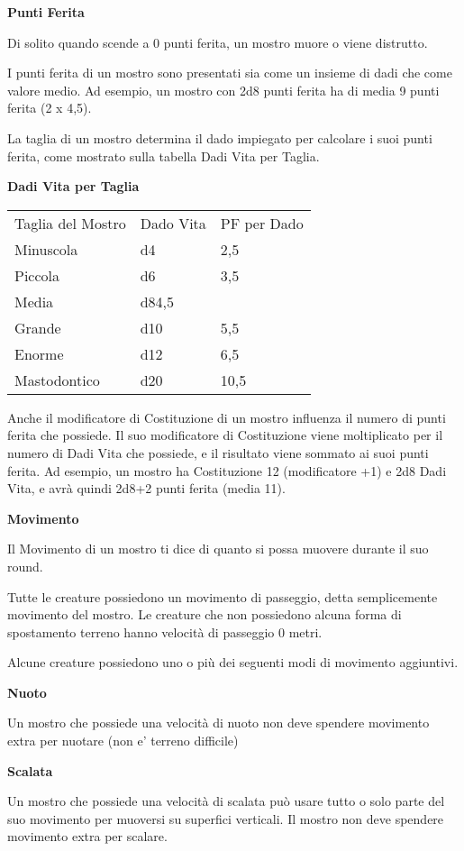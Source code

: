 \begin{multicols}{2}
\textbf{Punti Ferita}

Di solito quando scende a 0 punti ferita, un mostro muore o viene
distrutto.

I punti ferita di un mostro sono presentati sia come un insieme di dadi
che come valore medio. Ad esempio, un mostro con 2d8 punti ferita ha di
media 9 punti ferita (2 x 4,5).

La taglia di un mostro determina il dado impiegato per calcolare i suoi
punti ferita, come mostrato sulla tabella Dadi Vita per Taglia.

\textbf{Dadi Vita per Taglia}


\begin{tabular}{lll}
\toprule
Taglia del Mostro & Dado Vita & PF per Dado\\
Minuscola &d4&2,5\\
Piccola &d6&3,5\\
Media&d84,5\\
Grande&d10&5,5\\
Enorme&d12&6,5\\
Mastodontico&d20&10,5\\
\end{tabular}


Anche il modificatore di Costituzione di un mostro influenza il numero
di punti ferita che possiede. Il suo modificatore di Costituzione viene
moltiplicato per il numero di Dadi Vita che possiede, e il risultato
viene sommato ai suoi punti ferita. Ad esempio, un mostro ha
Costituzione 12 (modificatore +1) e 2d8 Dadi Vita, e avrà quindi 2d8+2
punti ferita (media 11).

\textbf{Movimento}

Il Movimento di un mostro ti dice di quanto si possa muovere durante il
suo round.

Tutte le creature possiedono un movimento di passeggio, detta
semplicemente movimento del mostro. Le creature che non possiedono alcuna
forma di spostamento terreno hanno velocità di passeggio 0 metri.

Alcune creature possiedono uno o più dei seguenti modi di movimento
aggiuntivi.

\textbf{Nuoto}

Un mostro che possiede una velocità di nuoto non deve spendere movimento
extra per nuotare (non e' terreno difficile)

\textbf{Scalata}

Un mostro che possiede una velocità di scalata può usare tutto o solo
parte del suo movimento per muoversi su superfici verticali. Il mostro
non deve spendere movimento extra per scalare.


\end{multicols}
